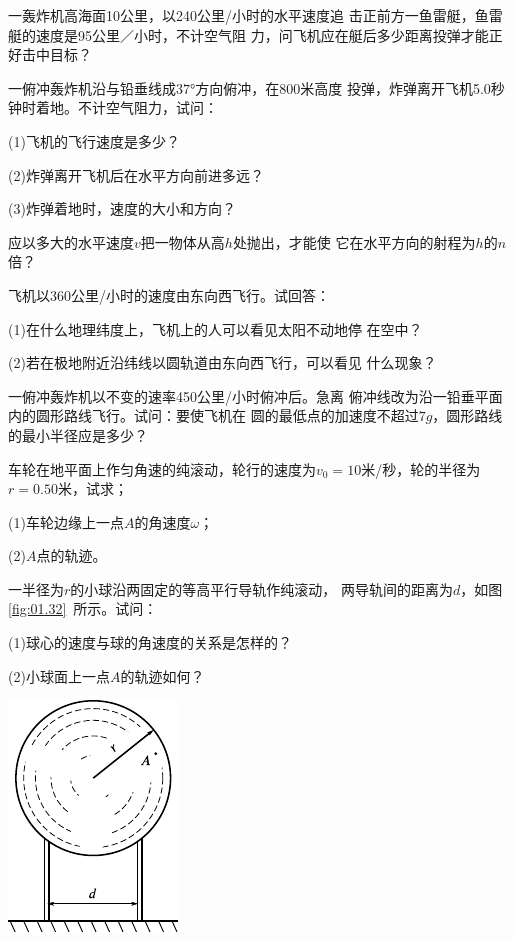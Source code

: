\begin{exercises}
\exercise 一轰炸机高海面10公里，以240公里/小时的水平速度追
击正前方一鱼雷艇，鱼雷艇的速度是95公里／小时，不计空气阻
力，问飞机应在艇后多少距离投弹才能正好击中目标？

\exercise 一俯冲轰炸机沿与铅垂线成$\ang{37;;}$方向俯冲，在800米高度
投弹，炸弹离开飞机5.0秒钟时着地。不计空气阻力，试问：

(1)飞机的飞行速度是多少？

(2)炸弹离开飞机后在水平方向前进多远？

(3)炸弹着地时，速度的大小和方向？

\exercise 应以多大的水平速度$v$把一物体从高$h$处抛出，才能使
它在水平方向的射程为$h$的$n$倍？

\exercise 飞机以360公里/小时的速度由东向西飞行。试回答：

(1)在什么地理纬度上，飞机上的人可以看见太阳不动地停
在空中？

(2)若在极地附近沿纬线以圆轨道由东向西飞行，可以看见
什么现象？

\exercise 一俯冲轰炸机以不变的速率450公里/小时俯冲后。急离
俯冲线改为沿一铅垂平面内的圆形路线飞行。试问：要使飞机在
圆的最低点的加速度不超过$7g$，圆形路线的最小半径应是多少？

\exercise 车轮在地平面上作匀角速的纯滚动，轮行的速度为$v_0=
  10$米/秒，轮的半径为$r=0.50$米，试求；

(1)车轮边缘上一点$A$的角速度$\omega$；

(2)$A$点的轨迹。

\exercise 一半径为$r$的小球沿两固定的等高平行导轨作纯滚动，
两导轨间的距离为$d$，如图\ref{fig:01.32}~所示。试问：

(1)球心的速度与球的角速度的关系是怎样的？

(2)小球面上一点$A$的轨迹如何？
\begin{figurex}
  \begin{center}
    \includegraphics{figure/fig01.32}
    \caption{}
    \label{fig:01.32}
  \end{center}
\end{figurex}

\end{exercises}